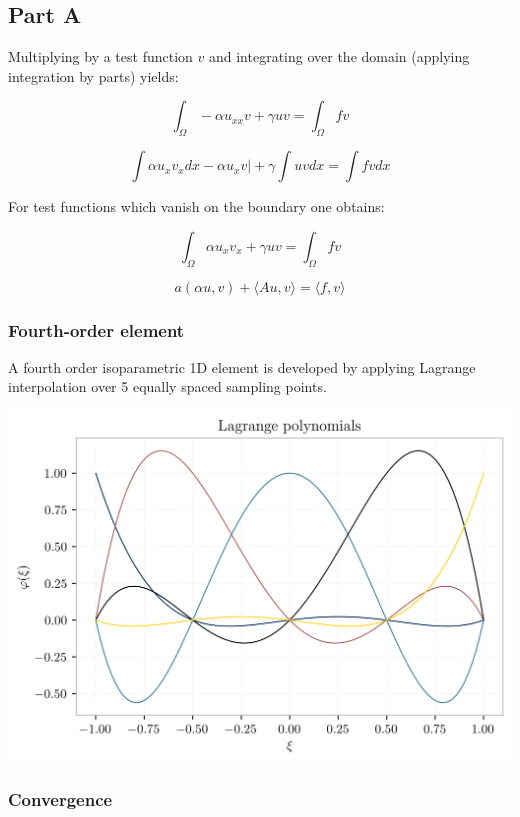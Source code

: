 \documentclass[
  11pt,
]{article}
\let\origfigure\figure
\let\endorigfigure\endfigure
\renewenvironment{figure}[1][2] {
    \expandafter\origfigure\expandafter[H]
} {
    \endorigfigure
}
\begin{document}
\hypertarget{part-a}{%
\subsection{Part A}\label{part-a}}

Multiplying by a test function \(v\) and integrating over the domain
(applying integration by parts) yields:

\[
\int_\Omega -\alpha u_{xx} v + \gamma u v = \int_\Omega f v
\]

\[
\int \alpha u_x v_x dx - \left. \alpha u_x v \right| + \gamma \int u v dx = \int f v dx
\]

For test functions which vanish on the boundary one obtains:

\[
\int_\Omega \alpha u_x v_x + \gamma u v = \int_\Omega f v
\]

\[
a(\alpha u,v) + \langle Au,v \rangle = \langle f,v\rangle
\]

\hypertarget{fourth-order-element}{%
\subsubsection{Fourth-order element}\label{fourth-order-element}}

A fourth order isoparametric 1D element is developed by applying
Lagrange interpolation over 5 equally spaced sampling points.

\begin{figure}
\centering
\includegraphics{../img/lagrange.png}
\caption{Shape functions}
\end{figure}

\hypertarget{convergence}{%
\subsubsection{Convergence}\label{convergence}}
\end{document}
